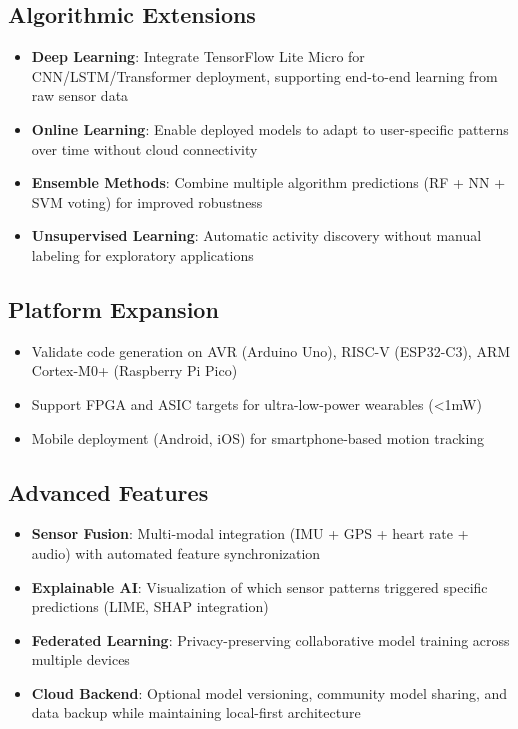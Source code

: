 \subsection{Algorithmic Extensions}
\begin{itemize}
    \item \textbf{Deep Learning}: Integrate TensorFlow Lite Micro for CNN/LSTM/Transformer deployment, supporting end-to-end learning from raw sensor data
    \item \textbf{Online Learning}: Enable deployed models to adapt to user-specific patterns over time without cloud connectivity
    \item \textbf{Ensemble Methods}: Combine multiple algorithm predictions (RF + NN + SVM voting) for improved robustness
    \item \textbf{Unsupervised Learning}: Automatic activity discovery without manual labeling for exploratory applications
\end{itemize}

\subsection{Platform Expansion}
\begin{itemize}
    \item Validate code generation on AVR (Arduino Uno), RISC-V (ESP32-C3), ARM Cortex-M0+ (Raspberry Pi Pico)
    \item Support FPGA and ASIC targets for ultra-low-power wearables (<1mW)
    \item Mobile deployment (Android, iOS) for smartphone-based motion tracking
\end{itemize}

\subsection{Advanced Features}
\begin{itemize}
    \item \textbf{Sensor Fusion}: Multi-modal integration (IMU + GPS + heart rate + audio) with automated feature synchronization
    \item \textbf{Explainable AI}: Visualization of which sensor patterns triggered specific predictions (LIME, SHAP integration)
    \item \textbf{Federated Learning}: Privacy-preserving collaborative model training across multiple devices
    \item \textbf{Cloud Backend}: Optional model versioning, community model sharing, and data backup while maintaining local-first architecture
\end{itemize}


